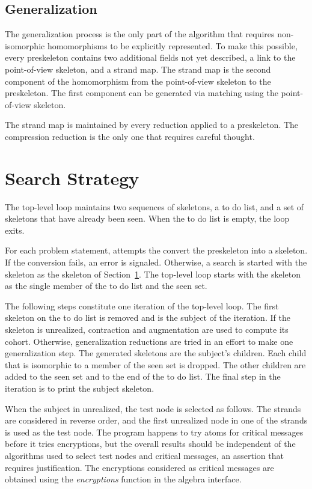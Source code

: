 \documentclass[12pt]{report}
\theoremstyle{definition}
\begin{document}
\section{Generalization}\label{sec:generalization}

The generalization process is the only part of the algorithm that
requires non-isomorphic homomorphisms to be explicitly represented.
To make this possible, every preskeleton contains two additional
fields not yet described, a link to the point-of-view skeleton, and a
{\pov} strand map.  The {\pov} strand map is the second component of
the homomorphism from the point-of-view skeleton to the preskeleton.
The first component can be generated via matching using the
point-of-view skeleton.

The {\pov} strand map is maintained by every reduction applied to a
preskeleton.  The compression reduction is the only one that
requires careful thought.

\chapter{Search Strategy}\label{cha:search}

The top-level loop maintains two sequences of skeletons, a to do list,
and a set of skeletons that have already been seen.  When the to do
list is empty, the loop exits.

For each problem statement, {\cpsa} attempts the convert the
preskeleton into a skeleton.  If the conversion fails, an error is
signaled.  Otherwise, a search is started with the skeleton as the
{\pov} skeleton of Section~\ref{sec:generalization}.  The top-level loop
starts with the {\pov} skeleton as the single member of the to do
list and the seen set.

The following steps constitute one iteration of the top-level loop.
The first skeleton on the to do list is removed and is the subject of
the iteration.  If the skeleton is unrealized, contraction and
augmentation are used to compute its cohort.  Otherwise, generalization
reductions are tried in an effort to make one generalization step.
The generated skeletons are the subject's children.  Each child that
is isomorphic to a member of the seen set is dropped.  The other
children are added to the seen set and to the end of the to do list.
The final step in the iteration is to print the subject skeleton.

When the subject in unrealized, the test node is selected as follows.
The strands are considered in reverse order, and the first unrealized
node in one of the strands is used as the test node.  The program
happens to try atoms for critical messages before it tries
encryptions, but the overall results should be independent of the
algorithms used to select test nodes and critical messages, an assertion
that requires justification.  The encryptions considered as critical
messages are obtained using the \emph{encryptions} function in the
algebra interface.
\end{document}
